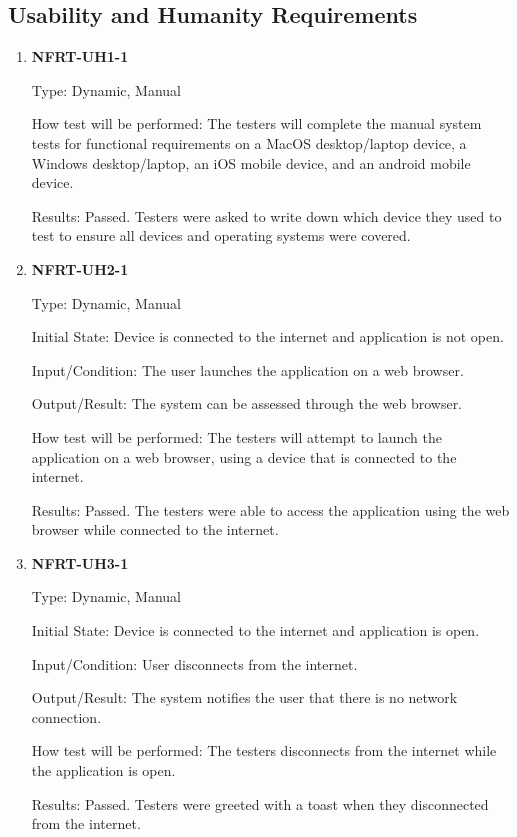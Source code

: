 \documentclass[12pt, titlepage]{article}
\begin{document}
\subsection{Usability and Humanity Requirements}
\begin{enumerate}
	\item \textbf{NFRT-UH1-1}

	      Type: Dynamic, Manual

	      How test will be performed: The testers will complete the manual system tests for functional
	      requirements on a MacOS desktop/laptop device, a Windows desktop/laptop, an iOS mobile device, and
	      an android mobile device.

	      Results: Passed. Testers were asked to write down which device they used to test to ensure all
	      devices and operating systems were covered.

	\item \textbf{NFRT-UH2-1}

	      Type: Dynamic, Manual

	      Initial State: Device is connected to the internet and application is not open.

	      Input/Condition: The user launches the application on a web browser.

	      Output/Result: The system can be assessed through the web browser.

	      How test will be performed: The testers will attempt to launch the application on a web browser,
	      using a device that is connected to the internet.

	      Results: Passed. The testers were able to access the application using the web browser while
	      connected to the internet.

	\item \textbf{NFRT-UH3-1}

	      Type: Dynamic, Manual

	      Initial State: Device is connected to the internet and application is open.

	      Input/Condition: User disconnects from the internet.

	      Output/Result: The system notifies the user that there is no network connection.

	      How test will be performed: The testers disconnects from the internet while the application is
	      open.

	      Results: Passed. Testers were greeted with a toast when they disconnected from the internet.

\end{enumerate}
\end{document}
